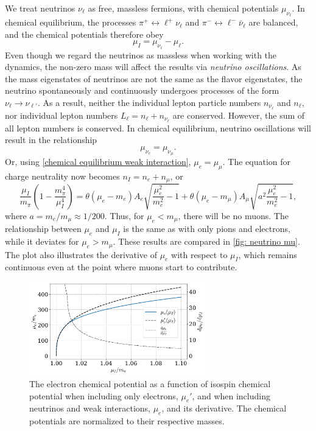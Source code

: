 We treat neutrinos $\nu_\ell$ as free, massless fermions, with chemical potentials $\mu_{\nu_\ell}$.
In chemical equilibrium, the processes $\pi^+ \leftrightarrow \ell^+ \nu_\ell $ and $\pi^- \leftrightarrow \ell^- \bar\nu_\ell $ are balanced, and the chemical potentials therefore obey
%
\begin{equation}
    \label{chemical equilibrium weak interaction}
    \mu_I = \mu_{\nu_\ell} - \mu_\ell.
\end{equation}
%
Even though we regard the neutrinos as massless when working with the dynamics, the non-zero mass will affect the results via \emph{neutrino oscillations}.
As the mass eigenstates of neutrinos are not the same as the flavor eigenstates, the neutrino spontaneously and continuously undergoes processes of the form $\nu_\ell \rightarrow \nu_{\ell'}$.
As a result, neither the individual lepton particle numbers $n_{\nu_\ell}$ and $n_{\ell}$, nor individual lepton numbers $L_\ell = n_\ell + n_{\nu_\ell}$ are conserved.
However, the sum of all lepton numbers is conserved.
In chemical equilibrium, neutrino oscillations will result in the relationship
%
\begin{equation}
    \mu_{\nu_e} = \mu_{\nu_\mu}.
\end{equation}
%
Or, using \autoref{chemical equilibrium weak interaction}, $\mu_e = \mu_\mu$.
The equation for charge neutrality now becomes $n_I = n_e + n_\mu$, or
%
\begin{equation}
    \label{chemical potential relationship neutrinos}
    \frac{\mu_I}{m_\pi} \left(1 - \frac{m_\pi^4}{\mu_I^4}\right)
    =
    \theta(\mu_e - m_e) 
    A_e \sqrt{\frac{\mu_e^2}{m_e^2} - 1}
    +
    \theta(\mu_e - m_\mu)
    A_\mu \sqrt{a^2 \frac{\mu_e^2}{m_e^2} - 1},
\end{equation}
%
where $a = m_e/m_\mu \approx 1 / 200$.
Thus, for $\mu_e < m_\mu$, there will be no muons. 
The relationship between $\mu_e$ and $\mu_I$ is the same as with only pions and electrons, while it deviates for $\mu_e > m_\mu$.
These results are compared in \autoref{fig: neutrino mu}.
The plot also illustrates the derivative of $\mu_e$ with respect to $\mu_I$, which remains continuous even at the point where muons start to contribute.

\begin{figure}[H]
    \centering
    \includegraphics[width=0.68\textwidth]{../scripts/figurer/neutrino_mu.pdf}
    \caption{
        The electron chemical potential as a function of isospin chemical potential when including only electrons, $\mu_e'$, and when including neutrinos and weak interactions, $\mu_e$, and its derivative.
        The chemical potentials are normalized to their respective masses.
    }
    \label{fig: neutrino mu}
\end{figure}


